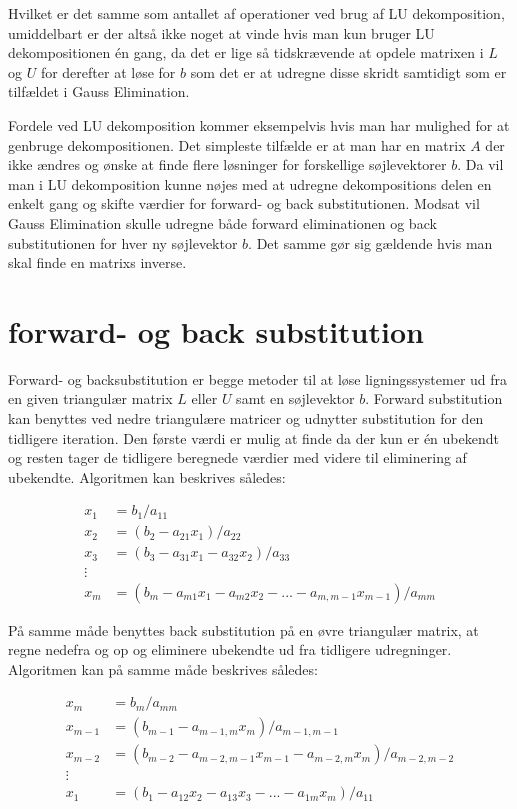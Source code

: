 \documentclass{article}
\begin{document}
Hvilket er det samme som antallet af operationer ved brug af LU dekomposition, umiddelbart er der altså ikke noget at vinde hvis man kun bruger LU dekompositionen én gang, da det er lige så tidskrævende at opdele matrixen i $L$ og $U$ for derefter at løse for $b$ som det er at udregne disse skridt samtidigt som er tilfældet i Gauss Elimination.  \vspace{\baselineskip}

Fordele ved LU dekomposition kommer eksempelvis hvis man har mulighed for at genbruge dekompositionen. Det simpleste tilfælde er at man har en matrix $A$ der ikke ændres og ønske at finde flere løsninger for forskellige søjlevektorer $b$. Da vil man i LU dekomposition kunne nøjes med at udregne dekompositions delen en enkelt gang og skifte værdier for forward- og back substitutionen. Modsat vil Gauss Elimination skulle udregne både forward eliminationen og back substitutionen for hver ny søjlevektor $b$. Det samme gør sig gældende hvis man skal finde en matrixs inverse.\vspace{\baselineskip}

\section{forward- og back substitution}
Forward- og backsubstitution er begge metoder til at løse ligningssystemer ud fra en given triangulær matrix $L$ eller $U$ samt en søjlevektor $b$. Forward substitution kan benyttes ved nedre triangulære matricer og udnytter substitution for den tidligere iteration. Den første værdi er mulig at finde da der kun er én ubekendt og resten tager de tidligere beregnede værdier med videre til eliminering af ubekendte. Algoritmen kan beskrives således:

\begin{align*}
x_1 &= b_1/a_{11}\\
x_2 &= (b_2 - a_{21} x_1)/a_{22}\\
x_3 &= (b_3 - a_{31}x_1-a_{32}x_2)/a_{33}\\
\vdots\\
x_m &= (b_m -a_{m1}x_1-a_{m2}x_2- ... -a_{m,m-1}x_{m-1})/a_{mm}
\end{align*}

På samme måde benyttes back substitution på en øvre triangulær matrix, at regne nedefra og op og eliminere ubekendte ud fra tidligere udregninger. Algoritmen kan på samme måde beskrives således:

\begin{align*}
x_m &= b_m/a_{mm}\\
x_{m-1} &= (b_{m-1} - a_{m-1,m}x_m )/a_{m-1,m-1}\\
x_{m-2} &= (b_{m-2} - a_{m-2,m-1}x_{m-1} - a_{m-2, m} x_m )/a_{m-2,m-2}\\
\vdots\\
x_1 &= (b_{1} - a_{12}x_{2} - a_{13} x_3 - ... - a_{1m}x_m )/a_{11}
\end{align*}
\end{document}
